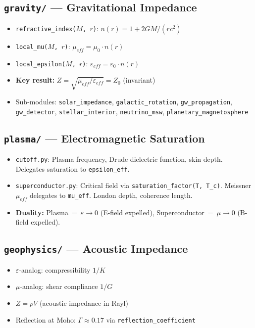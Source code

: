 \subsection{\texttt{gravity/} --- Gravitational Impedance}

\begin{itemize}
    \item \texttt{refractive\_index($M$, $r$)}: $n(r) = 1 + 2GM/(rc^2)$
    \item \texttt{local\_mu($M$, $r$)}: $\mu_{eff} = \mu_0 \cdot n(r)$
    \item \texttt{local\_epsilon($M$, $r$)}: $\varepsilon_{eff} = \varepsilon_0 \cdot n(r)$
    \item \textbf{Key result:} $Z = \sqrt{\mu_{eff}/\varepsilon_{eff}} = Z_0$ (invariant)
    \item Sub-modules: \texttt{solar\_impedance}, \texttt{galactic\_rotation},
          \texttt{gw\_propagation}, \texttt{gw\_detector},
          \texttt{stellar\_interior},
          \texttt{neutrino\_msw}, \texttt{planetary\_magnetosphere}
\end{itemize}

\subsection{\texttt{plasma/} --- Electromagnetic Saturation}

\begin{itemize}
    \item \texttt{cutoff.py}: Plasma frequency, Drude dielectric function,
          skin depth. Delegates saturation to \texttt{epsilon\_eff}.
    \item \texttt{superconductor.py}: Critical field via
          \texttt{saturation\_factor(T, T\_c)}. Meissner $\mu_{eff}$
          delegates to \texttt{mu\_eff}. London depth, coherence length.
    \item \textbf{Duality:}
          Plasma~=~$\varepsilon\to 0$ (E-field expelled),
          Superconductor~=~$\mu\to 0$ (B-field expelled).
\end{itemize}

\subsection{\texttt{geophysics/} --- Acoustic Impedance}

\begin{itemize}
    \item $\varepsilon$-analog: compressibility $1/K$
    \item $\mu$-analog: shear compliance $1/G$
    \item $Z = \rho V$ (acoustic impedance in Rayl)
    \item Reflection at Moho: $\Gamma \approx 0.17$ via
          \texttt{reflection\_coefficient}
\end{itemize}

